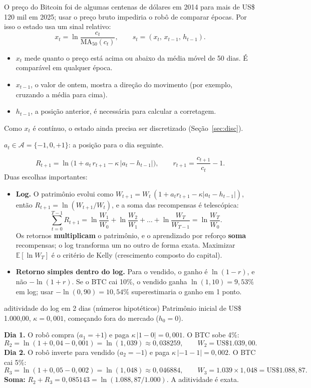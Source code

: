 \documentclass[11pt,a4paper]{article}
\newcommand{\bloco}[1]{\par\needspace{4\baselineskip}{\bfseries #1}\par\nopagebreak}
\begin{document}
\bloco{Estado}
O preço do Bitcoin foi de algumas centenas de dólares em 2014 para mais de US\$ 120 mil em 2025; usar o preço bruto impediria o robô de comparar épocas. Por isso o estado usa um sinal relativo:
\[
  x_t = \ln\frac{c_t}{\mathrm{MA}_{50}(c_t)}, \qquad s_t = (x_t,\, x_{t-1},\, h_{t-1}).
\]
\begin{itemize}
  \item $x_t$ mede quanto o preço está acima ou abaixo da média móvel de 50 dias. É comparável em qualquer época.
  \item $x_{t-1}$, o valor de ontem, mostra a direção do movimento (por exemplo, cruzando a média para cima).
  \item $h_{t-1}$, a posição anterior, é necessária para calcular a corretagem.
\end{itemize}
Como $x_t$ é contínuo, o estado ainda precisa ser discretizado (Seção~\ref{sec:disc}).

\bloco{Ação}
$a_t \in \mathcal{A} = \{-1, 0, +1\}$: a posição para o dia seguinte.

\bloco{Recompensa}
\[
  R_{t+1} = \ln\!\big(1 + a_t\, r_{t+1} - \kappa\, |a_t - h_{t-1}|\big), \qquad r_{t+1} = \frac{c_{t+1}}{c_t} - 1.
\]
Duas escolhas importantes:
\begin{itemize}
  \item \textbf{Log.} O patrimônio evolui como $W_{t+1} = W_t\,(1 + a_t r_{t+1} - \kappa|a_t - h_{t-1}|)$, então $R_{t+1} = \ln(W_{t+1}/W_t)$, e a soma das recompensas é telescópica:
  \[
    \sum_{t=0}^{T-1} R_{t+1} = \ln\frac{W_1}{W_0} + \ln\frac{W_2}{W_1} + \dots + \ln\frac{W_T}{W_{T-1}} = \ln\frac{W_T}{W_0}.
  \]
  Os retornos \textbf{multiplicam} o patrimônio, e o aprendizado por reforço \textbf{soma} recompensas; o log transforma um no outro de forma exata. Maximizar $\mathbb{E}[\ln W_T]$ é o critério de Kelly (crescimento composto do capital).
  \item \textbf{Retorno simples dentro do log.} Para o vendido, o ganho é $\ln(1 - r)$, e não $-\ln(1 + r)$. Se o BTC cai 10\%, o vendido ganha $\ln(1{,}10) = 9{,}53\%$ em log; usar $-\ln(0{,}90) = 10{,}54\%$ superestimaria o ganho em 1 ponto.
\end{itemize}

\begin{exemplo}{aditividade do log em 2 dias (números hipotéticos)}
Patrimônio inicial de US\$ 1.000,00, $\kappa = 0{,}001$, começando fora do mercado ($h_0 = 0$).

\textbf{Dia 1.} O robô compra ($a_1 = +1$) e paga $\kappa\,|1 - 0| = 0{,}001$. O BTC sobe 4\%:
\[
  R_2 = \ln(1 + 0{,}04 - 0{,}001) = \ln(1{,}039) \approx 0{,}038259, \qquad W_2 = \text{US\$ } 1.039{,}00.
\]
\textbf{Dia 2.} O robô inverte para vendido ($a_2 = -1$) e paga $\kappa\,|-1 - 1| = 0{,}002$. O BTC cai 5\%:
\[
  R_3 = \ln(1 + 0{,}05 - 0{,}002) = \ln(1{,}048) \approx 0{,}046884, \qquad W_3 = 1.039 \times 1{,}048 = \text{US\$ } 1.088{,}87.
\]
\textbf{Soma:} $R_2 + R_3 = 0{,}085143 = \ln(1.088{,}87 / 1.000)$. A aditividade é exata.
\end{exemplo}
\end{document}
